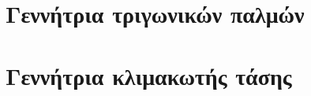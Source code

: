 \newcommand{\reporttitle}{Εργαστηριακές Ασκήσεις}
\newcommand{\reportauthorOne}{Καπετάνιος Αντώνιος}
\newcommand{\cidOne}{10417}
\newcommand{\reportauthorTwo}{Χαλκιάς Νικόλαος-Μάριος}
\newcommand{\cidTwo}{10472}





	

	\tableofcontents
	\newpage

	\chapter{Γεννήτρια τριγωνικών παλμών}
		

	\chapter{Γεννήτρια κλιμακωτής τάσης}
		

	\printbibliography[title={Αναφορές}]

